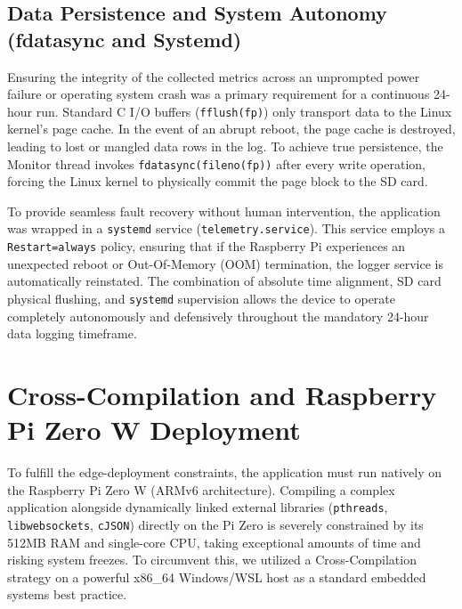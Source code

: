 \documentclass[12pt,a4paper]{article}
\begin{document}
\subsection{Data Persistence and System Autonomy (fdatasync and Systemd)}
Ensuring the integrity of the collected metrics across an unprompted power failure or operating system crash was a primary requirement for a continuous 24-hour run. Standard C I/O buffers (\texttt{fflush(fp)}) only transport data to the Linux kernel's page cache. In the event of an abrupt reboot, the page cache is destroyed, leading to lost or mangled data rows in the log. To achieve true persistence, the Monitor thread invokes \texttt{fdatasync(fileno(fp))} after every write operation, forcing the Linux kernel to physically commit the page block to the SD card.

To provide seamless fault recovery without human intervention, the application was wrapped in a \texttt{systemd} service (\texttt{telemetry.service}). This service employs a \texttt{Restart=always} policy, ensuring that if the Raspberry Pi experiences an unexpected reboot or Out-Of-Memory (OOM) termination, the logger service is automatically reinstated. The combination of absolute time alignment, SD card physical flushing, and \texttt{systemd} supervision allows the device to operate completely autonomously and defensively throughout the mandatory 24-hour data logging timeframe.

\section{Cross-Compilation and Raspberry Pi Zero W Deployment}

To fulfill the edge-deployment constraints, the application must run natively on the Raspberry Pi Zero W (ARMv6 architecture). Compiling a complex application alongside dynamically linked external libraries (\texttt{pthreads}, \texttt{libwebsockets}, \texttt{cJSON}) directly on the Pi Zero is severely constrained by its 512MB RAM and single-core CPU, taking exceptional amounts of time and risking system freezes. To circumvent this, we utilized a Cross-Compilation strategy on a powerful x86\_64 Windows/WSL host as a standard embedded systems best practice.
\end{document}
